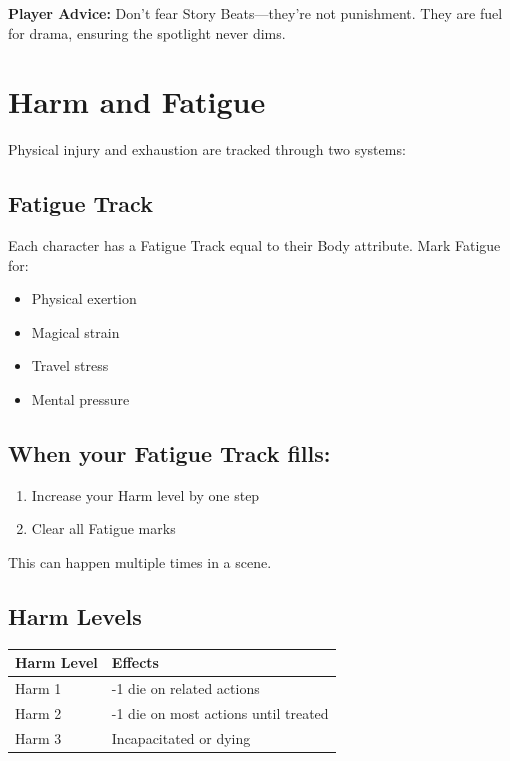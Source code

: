 \documentclass[11pt,twoside,openany]{book}
\begin{document}
\textbf{Player Advice:} Don't fear Story Beats---they're not punishment. They are fuel for drama, ensuring the spotlight never dims.

\section*{Harm and Fatigue} 

Physical injury and exhaustion are tracked through two systems:

\subsection*{Fatigue Track}

Each character has a Fatigue Track equal to their Body attribute. Mark Fatigue for:
\begin{itemize}
\item Physical exertion
\item Magical strain
\item Travel stress
\item Mental pressure
\end{itemize}

\subsection*{When your Fatigue Track fills:}
\begin{enumerate}
\item Increase your Harm level by one step
\item Clear all Fatigue marks
\end{enumerate}

This can happen multiple times in a scene.

\subsection*{Harm Levels}

\begin{center}
\begin{tabular}{|l|l|}
\hline
\textbf{Harm Level} & \textbf{Effects} \\
\hline
Harm 1 & -1 die on related actions \\
Harm 2 & -1 die on most actions until treated \\
Harm 3 & Incapacitated or dying \\
\hline
\end{tabular}
\end{center}
\end{document}
